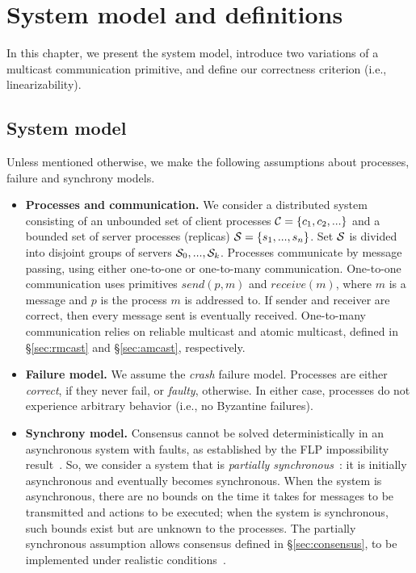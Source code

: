 \chapter[System model and definitions]{System model and definitions}
\label{sec:sysmodel}

In this chapter, we present the system model, introduce two variations of a
multicast communication primitive, and define our correctness criterion (i.e.,
linearizability).

\section{System model}

Unless mentioned otherwise, we make the following assumptions about processes,
failure and synchrony models.


\begin{itemize}
  \item \textbf{Processes and communication.} We consider a distributed system
  consisting of an unbounded set of client processes $\mathcal{C} = \{c_1, c_2, ...\}$
  and a bounded set of server processes (replicas) $\mathcal{S} = \{s_1, ..., s_n\}$.
  Set $\mathcal{S}$ is divided into disjoint groups of servers $\mathcal{S}_0, ..., \mathcal{S}_k$.
  Processes communicate by message passing, using either one-to-one or
  one-to-many communication. One-to-one communication uses primitives
  $send(p,m)$ and $receive(m)$, where $m$ is a message and $p$ is the process
  $m$ is addressed to. If sender and receiver are correct, then every message
  sent is eventually received. One-to-many communication relies on reliable
  multicast and atomic multicast, defined in \S\ref{sec:rmcast} and
  \S\ref{sec:amcast}, respectively.
  \item \textbf{Failure model.} We assume the \emph{crash} failure model.
  Processes are either \emph{correct}, if they never fail, or \emph{faulty},
  otherwise. In either case, processes do not experience arbitrary behavior
  (i.e., no Byzantine failures).
  \item \textbf{Synchrony model.} Consensus cannot be solved deterministically
  in an asynchronous system with faults, as established by the FLP impossibility
  result~\cite{FLP85}. So, we consider a system that is \emph{partially
  synchronous}~\cite{DLS88}: it is initially asynchronous and eventually becomes
  synchronous. When the system is asynchronous, there are no bounds on the time
  it takes for messages to be transmitted and actions to be executed; when the
  system  is synchronous, such bounds exist but are unknown to the processes.
  The partially synchronous assumption allows consensus defined in
  \S\ref{sec:consensus}, to be implemented under realistic
  conditions~\cite{FLP85,Lam98}.
\end{itemize}

